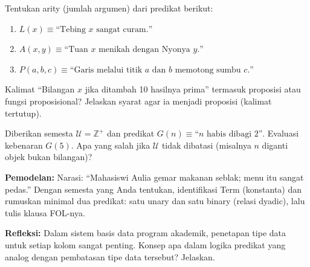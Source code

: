 \documentclass[../main]{subfiles}
\begin{document}

\begin{latihan}
  \item Tentukan arity (jumlah argumen) dari predikat berikut:
  \begin{enumerate}
    \item $L(x) \equiv \text{``Tebing } x \text{ sangat curam.''}$
    \item $A(x, y) \equiv \text{``Tuan } x \text{ menikah dengan Nyonya } y\text{.''}$
    \item $P(a, b, c) \equiv \text{``Garis melalui titik } a \text{ dan } b \text{ memotong sumbu } c\text{.''}$
  \end{enumerate}
  \item Kalimat ``Bilangan $x$ jika ditambah 10 hasilnya prima'' termasuk proposisi atau fungsi proposisional? Jelaskan syarat agar ia menjadi proposisi (kalimat tertutup).
  \item Diberikan semesta $\mathcal{U} = \mathbb{Z}^+$ dan predikat $G(n) \equiv \text{``}n \text{ habis dibagi 2''}$. Evaluasi kebenaran $G(5)$. Apa yang salah jika $\mathcal{U}$ tidak dibatasi (misalnya $n$ diganti objek bukan bilangan)?
  \item \textbf{Pemodelan:} Narasi: ``Mahasiswi Aulia gemar makanan seblak; menu itu sangat pedas.'' Dengan semesta yang Anda tentukan, identifikasi Term (konstanta) dan rumuskan minimal dua predikat: satu unary dan satu binary (relasi dyadic), lalu tulis klausa FOL-nya.
  \item \textbf{Refleksi:} Dalam sistem basis data program akademik, penetapan tipe data untuk setiap kolom sangat penting. Konsep apa dalam logika predikat yang analog dengan pembatasan tipe data tersebut? Jelaskan.
\end{latihan}

\end{document}
